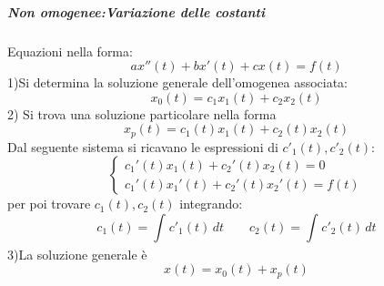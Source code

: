 \documentclass[a4paper, titlepage]{report}%
\theoremstyle{definition} %
\theoremstyle{plain}
\theoremstyle{plain}
\theoremstyle{remark}
\theoremstyle{remark}
\theoremstyle{plain}
\theoremstyle{plain}
\theoremstyle{plain}
\theoremstyle{plain}
\theoremstyle{plain}
\begin{document}
\subparagraph*{Non omogenee:Variazione delle costanti}
Equazioni nella forma:
\[
     ax''(t) + bx'(t) + cx(t)= f(t)
\]
1)Si determina la soluzione generale dell'omogenea associata:
\[
     x_0(t) = c_1 x_1(t) + c_2x_2(t)    
\]
2) Si trova una soluzione particolare nella forma
\[
     x_p(t) = c_1(t) x_1(t) + c_2(t) x_2(t)    
\]
Dal seguente sistema si ricavano le espressioni di $c'_1(t), c'_2(t)$:
\[
   \begin{cases}
    c_1'(t) x_1(t) + c_2'(t) x_2(t) = 0 
    \\
    c_1'(t) x_1'(t) + c_2'(t) x_2'(t) = f(t)
   \end{cases}    
\]
per poi trovare $c_1(t), c_2(t)$ integrando:
\[
    c_1(t) = \int_{}^{} c'_1(t) \, dt \qquad c_2(t) = \int_{}^{} c'_2(t) \,dt
\]
3)La soluzione generale è
\[
      x(t)= x_0(t) + x_p(t)    
\]
\end{document}
